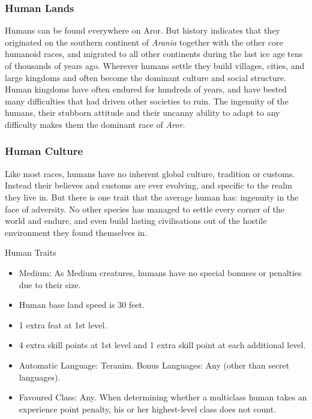 \subsubsection{Human Lands}

Humans can be found everywhere on Aror. But history indicates that they
originated on the southern continent of \emph{Arania} together with the other
core humanoid races, and migrated to all other continents during the last ice
age tens of thousands of years ago. Wherever humans settle they build
villages, cities, and large kingdoms and often become the dominant culture and
social structure. Human kingdoms have often endured for hundreds of years,
and have bested many difficulties that had driven other societies to ruin. The
ingenuity of the humans, their stubborn attitude and their uncanny ability to
adapt to any difficulty makes them the dominant race of \emph{Aror}.

\subsubsection{Human Culture}

Like most races, humans have no inherent global culture, tradition or customs.
Instead their believes and customs are ever evolving, and specific to the
realm they live in. But there is one trait that the average human has: ingenuity
in the face of adversity. No other species has managed to settle every corner
of the world and endure, and even build lasting civilisations out of the
hostile environment they found themselves in.

\begin{35e}{Human Traits}
  \begin{itemize}[noitemsep]
  \item Medium: As Medium creatures, humans have no special bonuses or
    penalties due to their size.
  \item Human base land speed is 30 feet.
  \item 1 extra feat at 1st level.
  \item 4 extra skill points at 1st level and 1 extra skill point at each
    additional level.
  \item Automatic Language: Teranim. Bonus Languages: Any (other than secret
    languages).
  \item Favoured Class: Any. When determining whether a multiclass human takes
    an experience point penalty, his or her highest-level class does not count.
  \end{itemize}
\end{35e}
